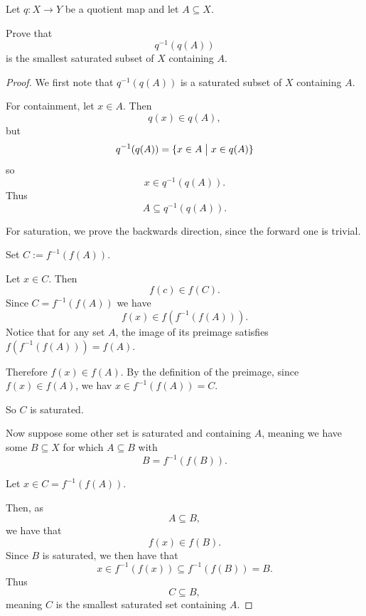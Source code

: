 \documentclass[11pt]{article}
\begin{document}
\begin{prob}
    Let $q : X \to Y$ be a quotient map and let 
    $A \subseteq X$. 

    Prove that 
    \[
        q^{-1}(q(A))
    \]
    is the smallest saturated subset of $X$ 
    containing $A$. 
\end{prob}
\begin{proof}
    We first note that $q^{-1}(q(A))$ is 
    a saturated subset of $X$ containing $A$. 

    For containment, let $x \in A$. 
    Then 
    \[
        q(x) \in q(A), 
    \]
    but 
    \[
        q^{-1}(q(A)) = \{x \in A \bigm| x \in q(A)\} 
    \]
    so 
    \[
        x \in q^{-1}(q(A)). 
    \]
    Thus 
    \[
        A \subseteq q^{-1}(q(A)). 
    \]

    For saturation, we prove the 
    backwards direction, since 
    the forward one is trivial. 

    Set $C := f^{-1}(f(A))$. 

    Let $x \in C$. 
    Then 
    \[
        f(c) \in f(C). 
    \]
    Since $C = f^{-1}(f(A))$ we have 
    \[
        f(x) \in f(f^{-1}(f(A))). 
    \]
    Notice that for any set $A$, the image of its 
    preimage satisfies $f(f^{-1}(f(A))) = f(A)$. 

    Therefore $f(x) \in f(A)$. 
    By the definition of the preimage, since $f(x) \in f(A)$, 
    we hav $x \in f^{-1}(f(A)) = C$. 

    So $C$ is saturated. 

    Now suppose some other set is saturated and 
    containing $A$, meaning we 
    have some $B \subseteq X$ for which 
    $A \subseteq B$ with 
    \[
        B = f^{-1}(f(B)). 
    \]

    Let $x \in C = f^{-1}(f(A))$. 

    Then, as  
    \[
        A \subseteq B, 
    \]
    we have that 
    \[
        f(x) \in f(B).  
    \]
    Since $B$ is saturated, we then have that 
    \[
        x \in f^{-1}(f(x)) \subseteq 
        f^{-1}(f(B)) = B. 
    \]  
    Thus 
    \[
        C \subseteq B, 
    \]
    meaning $C$ is the smallest saturated set 
    containing $A$. 
\end{proof}
\end{document}
